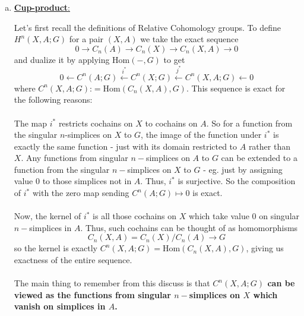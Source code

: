 \documentclass[11pt]{article}
\begin{document}
\begin{enumerate}[(a)]
  \item \underline{\textbf{Cup-product}:}
  
  \begin{dottedbox}
    Let's first recall the definitions of Relative Cohomology groups. To define $H^n(X, A; G)$ for a pair $(X,A)$ we take the exact sequence 
    $$ 0 \rightarrow C_n(A) \rightarrow C_n(X) \rightarrow C_n(X, A) \rightarrow 0 $$ and dualize it by applying $\mathrm{Hom}(-, G)$ to get 
    $$ 0 \leftarrow C^n(A; G) \xleftarrow{i^*} C^n(X; G) \xleftarrow{j^*} C^n(X, A; G) \leftarrow 0 $$
    where $C^n(X, A; G) \text{:}= \mathrm{Hom}(C_n(X, A), G)$. This sequence is exact for the following reasons: 
    \\
    \\
    The map $i^*$ restricts cochains on $X$ to cochains on $A$. So for a function from the singular $n$-simplices on $X$ to $G$, the image of the function under $i^*$ is exactly the same function - just with its domain restricted to $A$ rather than $X$. Any functions from singular $n-$simplices on $A$ to $G$ can be extended to a function from the singular $n-$simplices on $X$ to $G$ - eg. just by assigning value $0$ to those simplices not in $A$. Thus, $i^*$ is surjective. So the composition of $i^*$ with the zero map sending $C^{n}(A; G) \mapsto 0$ is exact.
    \\
    \\
    Now, the kernel of $i^*$ is all those cochains on $X$ which take value $0$ on singular $n-$simplices in $A$. Thus, such cochains can be thought of as homomorphisms $$C_{n}(X, A) = C_n(X)/C_n(A) \rightarrow G$$ so the kernel is exactly $C^n(X, A; G) = \mathrm{Hom}(C_n(X, A), G)$, giving us exactness of the entire sequence.
    \\
    \\
    The main thing to remember from this discuss is that \color{blue} \textbf{$C^n(X, A; G)$ can be viewed as the functions from singular $n-$simplices on $X$ which vanish on simplices in $A$.} \color{black}
  \end{dottedbox} 
  

\end{enumerate}
\end{document}
